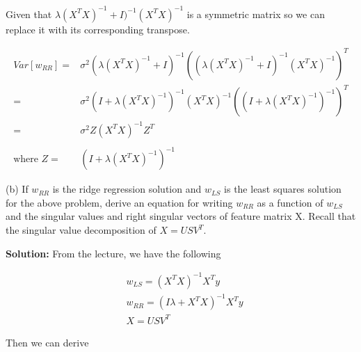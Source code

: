 \documentclass[11pt]{report}
\begin{document}
\justify
Given that $\lambda (X^TX)^{-1} + I)^{-1} (X^TX)^{-1}$ is a symmetric matrix so we can replace it with its corresponding transpose. 

\begin{equation*}
\begin{split}
Var[w_{RR}] = &\sigma^2 (\lambda (X^TX)^{-1} + I)^{-1} ((\lambda (X^TX)^{-1} + I)^{-1} (X^TX)^{-1})^T \\
= &\sigma^2 (I + \lambda(X^TX)^{-1})^{-1}  (X^TX)^{-1} ((I + \lambda(X^TX)^{-1})^{-1})^T \\
= &\sigma^2 Z (X^TX)^{-1} Z^T \\
\\
\text{where } Z = &(I + \lambda (X^TX)^{-1})^{-1}
\end{split} 
\end{equation*}

\pagebreak

\justify
(b) If $w_{RR}$ is the ridge regression solution and $w_{LS}$ is the least squares solution for the above problem,
derive an equation for writing $w_{RR}$ as a function of $w_{LS}$ and the singular values and right singular vectors
of feature matrix X. Recall that the singular value decomposition of $X = USV^T$.

\justify
\textbf{Solution:} From the lecture, we have the following

\begin{align*}
&w_{LS} = (X^T X)^{-1} X^T y \\
&w_{RR} = (I \lambda + X^T X)^{-1} X^T y \\
&X = USV^T
\end{align*}

\justify
Then we can derive
\end{document}
